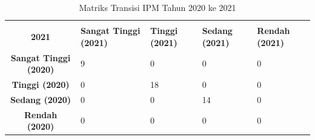 \begin{table}[H]
\centering
\caption{Matriks Transisi IPM Tahun 2020 ke 2021} \label{tab:ipm_transisi_2020_2021}
\begin{tabular}{|c|p{2cm}|p{2cm}|p{2cm}|p{2cm}|}
\hline
\makecell{\textbf{Tahun 2020} \\ \textbf{2021}} & \textbf{Sangat Tinggi (2021)} & \textbf{Tinggi (2021)} & \textbf{Sedang (2021)} & \textbf{Rendah (2021)} \\ \hline
\textbf{Sangat Tinggi (2020)} & 9 & 0 & 0 & 0 \\ \hline
\textbf{Tinggi (2020)} & 0 & 18 & 0 & 0 \\ \hline
\textbf{Sedang (2020)} & 0 & 0 & 14 & 0 \\ \hline
\textbf{Rendah (2020)} & 0 & 0 & 0 & 0 \\ \hline
\end{tabular}
\end{table}